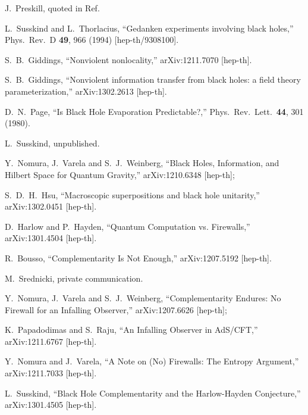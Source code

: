 \documentclass[12pt]{article}
\begin{document}
{\begin{thebibliography}{99}
J.~Preskill, quoted in Ref.~\cite{Susskind:1993if}

  L.~Susskind and L.~Thorlacius,
  ``Gedanken experiments involving black holes,''
  Phys.\ Rev.\ D {\bf 49}, 966 (1994)
  [hep-th/9308100].


  S.~B.~Giddings,
  ``Nonviolent nonlocality,''
  arXiv:1211.7070 [hep-th].

  S.~B.~Giddings,
  ``Nonviolent information transfer from black holes: a field theory parameterization,''
  arXiv:1302.2613 [hep-th].

  D.~N.~Page,
  ``Is Black Hole Evaporation Predictable?,''
  Phys.\ Rev.\ Lett.\  {\bf 44}, 301 (1980).

L.~Susskind, unpublished.

  Y.~Nomura, J.~Varela and S.~J.~Weinberg,
  ``Black Holes, Information, and Hilbert Space for Quantum Gravity,''
  arXiv:1210.6348 [hep-th];

  S.~D.~H.~Hsu,
  ``Macroscopic superpositions and black hole unitarity,''
  arXiv:1302.0451 [hep-th].

  D.~Harlow and P.~Hayden,
  ``Quantum Computation vs. Firewalls,''
  arXiv:1301.4504 [hep-th].

  R.~Bousso,
  ``Complementarity Is Not Enough,''
  arXiv:1207.5192 [hep-th].

M.~Srednicki, private communication.

  Y.~Nomura, J.~Varela and S.~J.~Weinberg,
  ``Complementarity Endures: No Firewall for an Infalling Observer,''
  arXiv:1207.6626 [hep-th];


  K.~Papadodimas and S.~Raju,
  ``An Infalling Observer in AdS/CFT,''
  arXiv:1211.6767 [hep-th].

  Y.~Nomura and J.~Varela,
  ``A Note on (No) Firewalls: The Entropy Argument,''
  arXiv:1211.7033 [hep-th].

  L.~Susskind,
  ``Black Hole Complementarity and the Harlow-Hayden Conjecture,''
  arXiv:1301.4505 [hep-th].


\end{thebibliography}}
\end{document}
